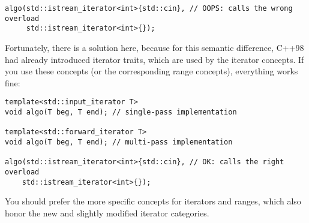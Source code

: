 \begin{lstlisting}[style=styleCXX]
algo(std::istream_iterator<int>{std::cin}, // OOPS: calls the wrong overload
	 std::istream_iterator<int>{});
\end{lstlisting}

Fortunately, there is a solution here, because for this semantic difference, C++98 had already introduced iterator traits, which are used by the iterator concepts. If you use these concepts (or the corresponding range concepts), everything works fine:

\begin{lstlisting}[style=styleCXX]
template<std::input_iterator T>
void algo(T beg, T end); // single-pass implementation
	
template<std::forward_iterator T>
void algo(T beg, T end); // multi-pass implementation

algo(std::istream_iterator<int>{std::cin}, // OK: calls the right overload
	std::istream_iterator<int>{});
\end{lstlisting}

You should prefer the more specific concepts for iterators and ranges, which also honor the new and slightly modified iterator categories.



















